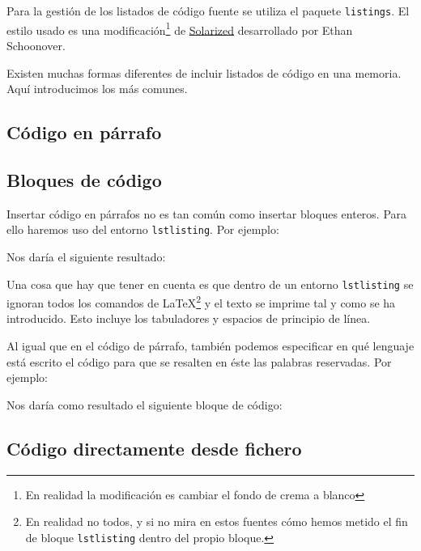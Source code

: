 Para la gestión de los listados de código fuente se utiliza el paquete \texttt{listings}. El estilo usado es una modificación\footnote{En realidad la modificación es cambiar el fondo de crema a blanco} de \href{https://ethanschoonover.com/solarized/}{Solarized} desarrollado por Ethan Schoonover.

Existen muchas formas diferentes de incluir listados de código en una memoria. Aquí introducimos los más comunes.

\subsection{Código en párrafo}

\subsection{Bloques de código}

Insertar código en párrafos no es tan común como insertar bloques enteros. Para ello haremos uso del entorno \texttt{lstlisting}. Por ejemplo:



Nos daría el siguiente resultado:



Una cosa que hay que tener en cuenta es que dentro de un entorno \texttt{lstlisting} se ignoran todos los comandos de \LaTeX\space\footnote{En realidad no todos, y si no mira en estos fuentes cómo hemos metido el fin de bloque \texttt{lstlisting} dentro del propio bloque.} y el texto se imprime tal y como se ha introducido. Esto incluye los tabuladores y espacios de principio de línea.

Al igual que en el código de párrafo, también podemos especificar en qué lenguaje está escrito el código para que se resalten en éste las palabras reservadas. Por ejemplo:



Nos daría como resultado el siguiente bloque de código:
 


\subsection{Código directamente desde fichero}

